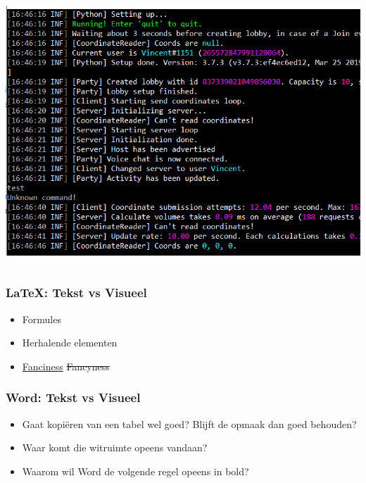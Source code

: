 \documentclass[../presentatie.tex]{subfiles}
\begin{document}
\begin{frame}
\begin{columns}
\begin{column}{0.5\textwidth}
                \medskip
                \includegraphics[trim={0px 90px 0px 5px},clip,width=\linewidth,height=0.4\textheight,keepaspectratio]{assets/consoleOutput.png}
            \end{column}
        \end{columns}
    \end{frame}

    \begin{frame}
        \frametitle{\LaTeX: Tekst vs Visueel}
        
        \begin{itemize}
            \item Formules
            \item Herhalende elementen
            \item  {\ul{Fanciness}} {\setul{0pt}{1pt}\st{Fancyness}}
        \end{itemize}
    \end{frame}
    
    \begin{frame}
        \frametitle{Word: Tekst vs Visueel}
        
        \begin{itemize}
            \item Gaat kopiëren van een tabel wel goed? Blijft de opmaak dan goed behouden?
            \item Waar komt die witruimte opeens vandaan?
            \item Waarom wil Word de volgende regel opeens in bold?
        \end{itemize}
    
    \end{frame}
    
\end{document}

